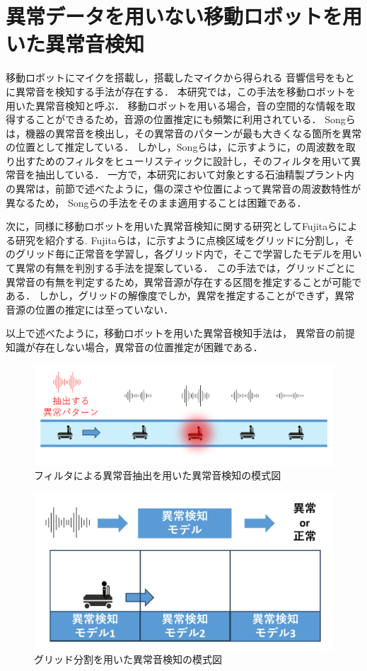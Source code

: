 \documentclass[../main]{subfiles}
\begin{document}
\section{異常データを用いない移動ロボットを用いた異常音検知}
\label{sec:related_work_mobile}

移動ロボットにマイクを搭載し，搭載したマイクから得られる
音響信号をもとに異常音を検知する手法が存在する．
本研究では，この手法を移動ロボットを用いた異常音検知と呼ぶ．
移動ロボットを用いる場合，音の空間的な情報を取得することができるため，音源の位置推定にも頻繁に利用されている．
Songらは，機器の異常音を検出し，その異常音のパターンが最も大きくなる箇所を異常の位置として推定している\cite{9023943}．
しかし，Songらは，に示すように，の周波数を取り出すためのフィルタをヒューリスティックに設計し，そのフィルタを用いて異常音を抽出している．
一方で，本研究において対象とする石油精製プラント内の異常は，前節で述べたように，傷の深さや位置によって異常音の周波数特性が異なるため，
Songらの手法をそのまま適用することは困難である．

次に，同様に移動ロボットを用いた異常音検知に関する研究としてFujitaらによる研究を紹介する\cite{10202270}.
Fujitaらは，に示すように点検区域をグリッドに分割し，そのグリッド毎に正常音を学習し，各グリッド内で，そこで学習したモデルを用いて異常の有無を判別する手法を提案している．
この手法では，グリッドごとに異常音の有無を判定するため，異常音源が存在する区間を推定することが可能である．
しかし，グリッドの解像度でしか，異常を推定することができず，異常音源の位置の推定には至っていない．

以上で述べたように，移動ロボットを用いた異常音検知手法は，
異常音の前提知識が存在しない場合，異常音の位置推定が困難である．

\begin{figure}[t]
  \centering
  \includegraphics[keepaspectratio, width=1.0\linewidth]{chap2/supervised_prev_research.png}
  \caption{フィルタによる異常音抽出を用いた異常音検知の模式図}
  \label{fig:supervised_prev_research}
\end{figure}

\begin{figure}[t]
  \centering
  \includegraphics[keepaspectratio, width=1.0\linewidth]{chap2/fujita_previous_research.png}
  \caption{グリッド分割を用いた異常音検知の模式図}
  \label{fig:fujita_previous_research}
\end{figure}
\end{document}
